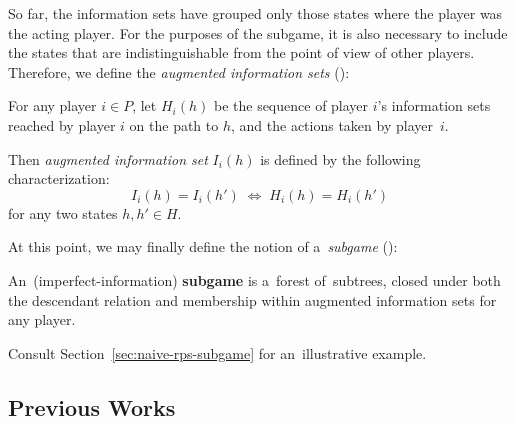 So far, the information sets have grouped only those states where the player was the acting player.
For the purposes of the subgame, it is also necessary to include the states that are indistinguishable from the point of view of other players.
Therefore, we define the \emph{augmented information sets} (\cite{BurchJohansonBowling13}):
\begin{defn}
  For any player $i \in P$, let $H_i(h)$ be the sequence of player $i$'s information sets reached by player $i$ on the path to $h$, and the actions taken by player~$i$.

  Then \emph{augmented information set} $I_i(h)$ is defined by the following characterization:
  \[ I_i (h) = I_i (h') \; \Longleftrightarrow \; H_i (h) = H_i (h') \]
  for any two states $h, h' \in H$.
\end{defn}
At this point, we may finally define the notion of a~\emph{subgame} (\cite{BurchJohansonBowling13}):
\begin{defn}[subgame]
  \label{defn:subgame}
  An~(imperfect-information) \textbf{subgame} is a~forest of~subtrees, closed under both the descendant relation and membership within augmented information sets for any player.
\end{defn}
Consult Section~\ref{sec:naive-rps-subgame} for an~illustrative example.

\subsection{Previous Works}
